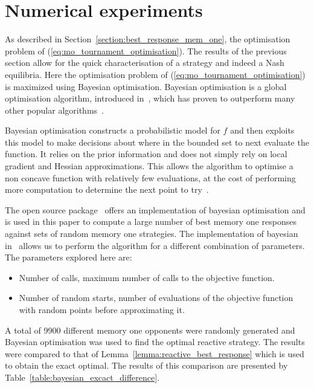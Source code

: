 \documentclass[10pt]{article}
\begin{document}
\section{Numerical experiments} \label{section:numerical_experiments}

As described in Section~\ref{section:best_response_mem_one}, the optimisation
problem of (\ref{eq:mo_tournament_optimisation}).
The results of the previous section allow for the quick characterisation of a
strategy and indeed a Nash equilibria.
Here the optimisation problem of (\ref{eq:mo_tournament_optimisation})
is maximized using Bayesian optimisation. Bayesian optimisation is a
global optimisation algorithm, introduced in~\cite{Mokus1978}, which has proven to
outperform many other popular algorithms~\cite{Jones2001}.

Bayesian optimisation constructs a probabilistic
model for \(f\) and then exploits this model to make decisions about where in the
bounded set to next evaluate the function. It relies on the prior information
and does not simply rely on local gradient and Hessian approximations.
This allows the algorithm to optimise a non concave function with relatively few
evaluations, at the cost of performing more computation to determine the next point
to try~\cite{snoek2012}.

The open source package~\cite{Head2018} offers an implementation of bayesian
optimisation and is used in this paper to compute a large number of best memory
one responses against sets of random memory one strategies. The implementation
of bayesian in~\cite{Head2018} allows us to perform the algorithm for a
different combination of parameters.  The parameters explored here are:

\begin{itemize}
    \item Number of calls, maximum number of calls to the objective function.
    \item Number of random starts, number of evaluations of the objective function
    with random points before approximating it.
\end{itemize}

A total of 9900 different memory one opponents were randomly generated and
Bayesian optimisation was used to find the optimal reactive strategy. The
results were compared to that of Lemma~\ref{lemma:reactive_best_response} which
is used to obtain the exact optimal.  The results of this comparison are
presented by Table~\ref{table:bayesian_excact_difference}.
\end{document}
